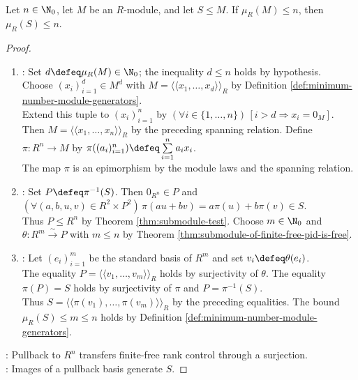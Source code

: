 \begin{corollary} \label{cor:submodule-generator-bound-pid} \\
Let $n\in\N_0$, let $M$ be an $R$-module, and let $S\leq M$. If $\mu_R(M)\leq n$, then $\mu_R(S)\leq n$.
\begin{proof}
\begin{enumerate}[label=(\roman*)]
\setlength{\itemsep}{0pt}
\item {}: Set $d\defeq\mu_R(M)\in\N_0$; the inequality $d\leq n$ holds by hypothesis.\\
Choose $(x_i)_{i=1}^d\in M^d$ with $M=\langle\!\langle x_1,\ldots,x_d\rangle\!\rangle_R$ by Definition \ref{def:minimum-number-module-generators}.\\
Extend this tuple to $(x_i)_{i=1}^n$ by $(\forall i\in\{1,\ldots,n\})\,[i>d\Rightarrow x_i=0_M]$.\\
Then $M=\langle\!\langle x_1,\ldots,x_n\rangle\!\rangle_R$ by the preceding spanning relation. Define $\pi:R^n\to M$ by $\pi((a_i)_{i=1}^n)\defeq\sum\limits_{i=1}^na_ix_i$.\\
The map $\pi$ is an epimorphism by the module laws and the spanning relation.
\item {}: Set $P\defeq\pi^{-1}(S)$. Then $0_{R^n}\in P$ and $(\forall(a,b,u,v)\in R^2\times P^2)\,\pi(au+bv)=a\pi(u)+b\pi(v)\in S$.\\
Thus $P\leq R^n$ by Theorem \ref{thm:submodule-test}. Choose $m\in\N_0$ and $\theta:R^m\xrightarrow{\sim}P$ with $m\leq n$ by Theorem \ref{thm:submodule-of-finite-free-pid-is-free}.
\item {}: Let $(e_i)_{i=1}^m$ be the standard basis of $R^m$ and set $v_i\defeq\theta(e_i)$.\\
The equality $P=\langle\!\langle v_1,\ldots,v_m\rangle\!\rangle_R$ holds by surjectivity of $\theta$. The equality $\pi(P)=S$ holds by surjectivity of $\pi$ and $P=\pi^{-1}(S)$.\\
Thus $S=\langle\!\langle\pi(v_1),\ldots,\pi(v_m)\rangle\!\rangle_R$ by the preceding equalities. The bound $\mu_R(S)\leq m\leq n$ holds by Definition \ref{def:minimum-number-module-generators}.
\end{enumerate}
: Pullback to $R^n$ transfers finite-free rank control through a surjection.\\
: Images of a pullback basis generate $S$.
\end{proof}
\end{corollary}

